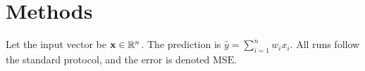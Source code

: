 \section{Methods}
Let the input vector be $\mathbf{x} \in \mathbb{R}^{n}$.
The prediction is
$\hat{y} = \sum_{i=1}^{n} w_i x_i$.
All runs follow the standard protocol, and the error is denoted
$\mathrm{MSE}$.
